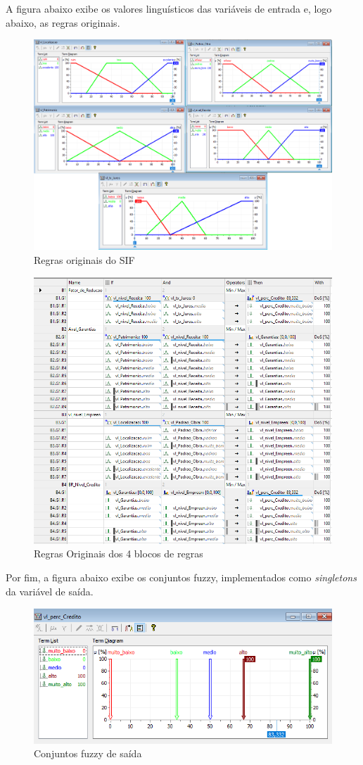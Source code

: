 \documentclass[12pt]{article}
\begin{document}
A figura abaixo exibe os valores linguísticos das variáveis de entrada e, logo abaixo, as regras originais.
\begin{figure}[H]
	\centering
	\includegraphics[width=0.9\linewidth]{Imagens/financiamento/VariaveisOriginais}
	\caption{Regras originais do SIF}
	\label{fig:variaveisoriginais}
\end{figure}

\begin{figure}[H]
	\centering
	\includegraphics[width=0.8\linewidth]{Imagens/financiamento/RegrasOriginais}
	\caption{Regras Originais dos 4 blocos de regras}
	\label{fig:regrasoriginaisFinanciamento}
\end{figure}

Por fim, a figura abaixo exibe os conjuntos fuzzy, implementados como \textit{singletons} da variável de saída.
\begin{figure}[H]
	\centering
	\includegraphics[width=0.7\linewidth]{Imagens/financiamento/CreditoFinalOriginal}
	\caption{Conjuntos fuzzy de saída}
	\label{fig:creditofinaloriginal}
\end{figure}
\end{document}
